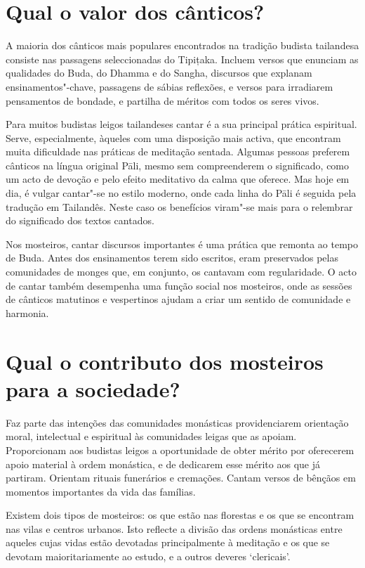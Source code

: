 \section{Qual o valor dos cânticos?}

A maioria dos cânticos mais populares encontrados na tradição budista
tailandesa consiste nas passagens seleccionadas do Tipițaka. Incluem
versos que enunciam as qualidades do Buda, do Dhamma e do Sangha,
discursos que explanam ensinamentos"-chave, passagens de sábias
reflexões, e versos para irradiarem pensamentos de bondade, e partilha
de méritos com todos os seres vivos.

Para muitos budistas leigos tailandeses cantar é a sua principal prática
espiritual. Serve, especialmente, àqueles com uma disposição mais
activa, que encontram muita dificuldade nas práticas de meditação
sentada. Algumas pessoas preferem cânticos na língua original Pāli,
mesmo sem compreenderem o significado, como um acto de devoção e pelo
efeito meditativo da calma que oferece. Mas hoje em dia, é vulgar
cantar"-se no estilo moderno, onde cada linha do Pāli é seguida pela
tradução em Tailandês. Neste caso os benefícios viram"-se mais para o
relembrar do significado dos textos cantados.

Nos mosteiros, cantar discursos importantes é uma prática que remonta ao
tempo de Buda. Antes dos ensinamentos terem sido escritos, eram
preservados pelas comunidades de monges que, em conjunto, os cantavam
com regularidade. O acto de cantar também desempenha uma função social
nos mosteiros, onde as sessões de cânticos matutinos e vespertinos
ajudam a criar um sentido de comunidade e harmonia.

\section{Qual o contributo dos mosteiros para a sociedade?}

Faz parte das intenções das comunidades monásticas providenciarem
orientação moral, intelectual e espiritual às comunidades leigas que as
apoiam. Proporcionam aos budistas leigos a oportunidade de obter mérito
por oferecerem apoio material à ordem monástica, e de dedicarem esse
mérito aos que já partiram. Orientam rituais funerários e
cremações. Cantam versos de bênçãos em momentos importantes da vida das
famílias.

Existem dois tipos de mosteiros: os que estão nas florestas e os que se
encontram nas vilas e centros urbanos. Isto reflecte a divisão das
ordens monásticas entre aqueles cujas vidas estão devotadas
principalmente à meditação e os que se devotam maioritariamente ao estudo,
e a outros deveres `clericais'.


